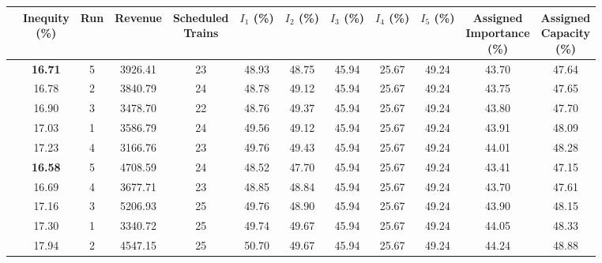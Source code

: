 \documentclass[preprint,12pt]{elsarticle}
\begin{document}
\begin{table}[htbp]
\centering
\begin{adjustbox}{max width=\textwidth}
\begin{tabular}{|c|c|c|c|c|c|c|c|c|c|c|c|}
\cline{2-12}
 \multicolumn{1}{c|}{} & \makecell{\textbf{Inequity} \\ \textbf{(\%)}} & \textbf{Run} & \textbf{Revenue} & \makecell{\textbf{Scheduled} \\ \textbf{Trains}} & \makecell{\textbf{$I_1$} \\ \textbf{(\%)}} & \makecell{\textbf{$I_2$}  \\ \textbf{(\%)}} & \makecell{\textbf{$I_3$}  \\ \textbf{(\%)}} & \makecell{\textbf{$I_4$} \\ \textbf{(\%)}} & \makecell{\textbf{$I_5$} \\ \textbf{(\%)}} & \makecell{\textbf{Assigned} \\ \textbf{Importance} \\ \textbf{(\%)}} & \makecell{\textbf{Assigned} \\ \textbf{Capacity} \\ \textbf{(\%)}} \\ \cline{2-13} \hline

\parbox[t]{2mm}{} & \textbf{16.71}     & 5 & 3926.41 & 23 & 48.93 & 48.75 & 45.94 & 25.67 & 49.24 & 43.70 & 47.64 \\
& 16.78 & 2 & 3840.79 & 24 & 48.78 & 49.12 & 45.94 & 25.67 & 49.24 & 43.75 & 47.65 \\
& 16.90 & 3 & 3478.70 & 22 & 48.76 & 49.37 & 45.94 & 25.67 & 49.24 & 43.80 & 47.70 \\
& 17.03 & 1 & 3586.79 & 24 & 49.56 & 49.12 & 45.94 & 25.67 & 49.24 & 43.91 & 48.09 \\
& 17.23 & 4 & 3166.76 & 23 & 49.76 & 49.43 & 45.94 & 25.67 & 49.24 & 44.01 & 48.28 \\ \hline

\parbox[t]{2mm}{} & \textbf{16.58} & 5 & 4708.59 & 24 & 48.52 & 47.70 & 45.94 & 25.67 & 49.24 & 43.41 & 47.15 \\
& 16.69 & 4 & 3677.71 & 23 & 48.85 & 48.84 & 45.94 & 25.67 & 49.24 & 43.70 & 47.61 \\
& 17.16 & 3 & 5206.93 & 25 & 49.76 & 48.90 & 45.94 & 25.67 & 49.24 & 43.90 & 48.15 \\
& 17.30 & 1 & 3340.72 & 25 & 49.74 & 49.67 & 45.94 & 25.67 & 49.24 & 44.05 & 48.33 \\
& 17.94 & 2 & 4547.15 & 25 & 50.70 & 49.67 & 45.94 & 25.67 & 49.24 & 44.24 & 48.88 \\ \hline


\end{tabular}
\end{adjustbox}
\end{table}
\end{document}
